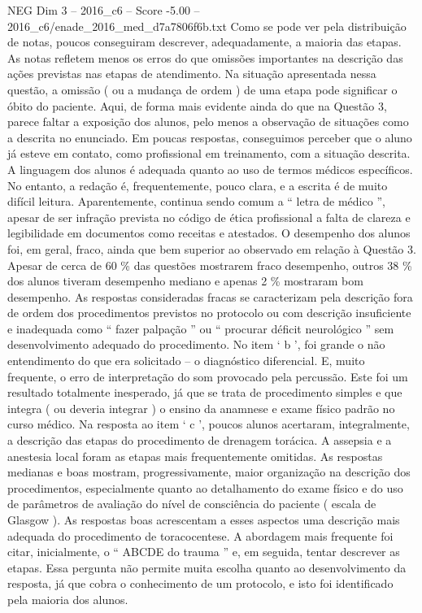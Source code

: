 \begin{textsample}{NEG Dim 3 – 2016\_c6 – Score -5.00 – 2016\_c6/enade\_2016\_med\_d7a7806f6b.txt}
Como se pode ver pela distribuição de notas, poucos conseguiram descrever, adequadamente, a maioria das etapas.
As notas refletem menos os erros do que omissões importantes na descrição das ações previstas nas etapas de atendimento.
Na situação apresentada nessa questão, a omissão ( ou a mudança de ordem ) de uma etapa pode significar o óbito do paciente.
Aqui, de forma mais evidente ainda do que na Questão 3, parece faltar a exposição dos alunos, pelo menos a observação de situações como a descrita no enunciado.
Em poucas respostas, conseguimos perceber que o aluno já esteve em contato, como profissional em treinamento, com a situação descrita.
A linguagem dos alunos é adequada quanto ao uso de termos médicos específicos.
No entanto, a redação é, frequentemente, pouco clara, e a escrita é de muito difícil leitura.
Aparentemente, continua sendo comum a “ letra de médico ”, apesar de ser infração prevista no código de ética profissional a falta de clareza e legibilidade em documentos como receitas e atestados.
O desempenho dos alunos foi, em geral, fraco, ainda que bem superior ao observado em relação à Questão 3.
Apesar de cerca de 60 \% das questões mostrarem fraco desempenho, outros 38 \% dos alunos tiveram desempenho mediano e apenas 2 \% mostraram bom desempenho.
As respostas consideradas fracas se caracterizam pela descrição fora de ordem dos procedimentos previstos no protocolo ou com descrição insuficiente e inadequada como “ fazer palpação ” ou “ procurar déficit neurológico ” sem desenvolvimento adequado do procedimento.
No item ‘ b ’, foi grande o não entendimento do que era solicitado – o diagnóstico diferencial.
E, muito frequente, o erro de interpretação do som provocado pela percussão.
Este foi um resultado totalmente inesperado, já que se trata de procedimento simples e que integra ( ou deveria integrar ) o ensino da anamnese e exame físico padrão no curso médico.
Na resposta ao item ‘ c ’, poucos alunos acertaram, integralmente, a descrição das etapas do procedimento de drenagem torácica.
A assepsia e a anestesia local foram as etapas mais frequentemente omitidas.
As respostas medianas e boas mostram, progressivamente, maior organização na descrição dos procedimentos, especialmente quanto ao detalhamento do exame físico e do uso de parâmetros de avaliação do nível de consciência do paciente ( escala de Glasgow ).
As respostas boas acrescentam a esses aspectos uma descrição mais adequada do procedimento de toracocentese.
A abordagem mais frequente foi citar, inicialmente, o “ ABCDE do trauma ” e, em seguida, tentar descrever as etapas.
Essa pergunta não permite muita escolha quanto ao desenvolvimento da resposta, já que cobra o conhecimento de um protocolo, e isto foi identificado pela maioria dos alunos.

\end{textsample}
